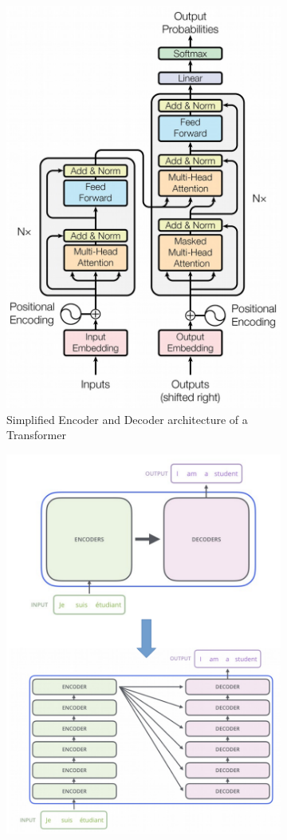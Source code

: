 \documentclass[11pt]{article}
\begin{document}
\begin{figure}[htb]
	\begin{subfigure}[t]{0.45\linewidth}
		\centering
		\includegraphics[width=0.8\linewidth]{img/transformer_architecture}
		\caption{Simplified Encoder and Decoder architecture of a Transformer}
	\end{subfigure}
	\hfill
	\begin{subfigure}[t]{0.45\linewidth}
		\centering
		\includegraphics[width=0.8\linewidth]{img/transformer_stacked_enc_dec}

\end{subfigure}
\end{figure}
\end{document}
